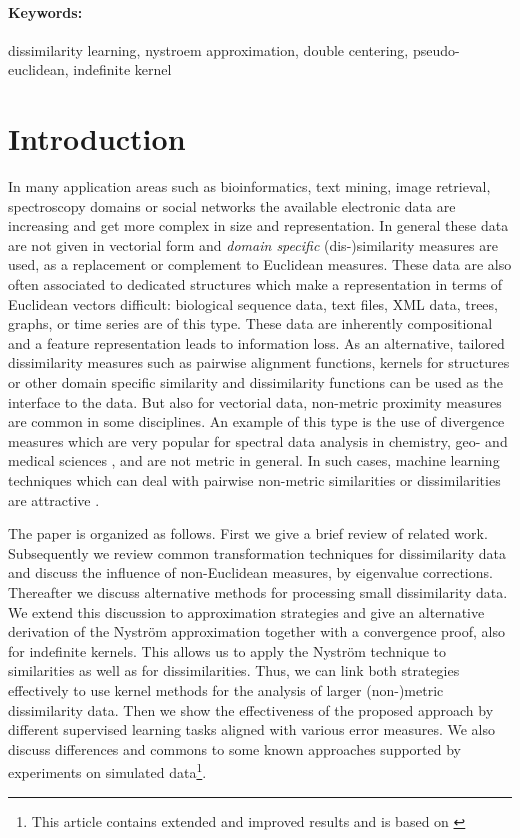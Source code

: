 \documentclass[twoside,11pt]{article}
\begin{document}
\paragraph*{Keywords:}
dissimilarity learning, nystroem approximation,
double centering, pseudo-euclidean, indefinite kernel



\section{Introduction}
In many application areas such as bioinformatics, text mining, image retrieval, spectroscopy domains or
social networks the available electronic data are increasing and get more complex in size and representation.
In general these data are not given in vectorial form and \emph{domain specific} (dis-)similarity measures 
are used, as a replacement or complement to Euclidean measures. These data are also often associated to dedicated 
structures which make a representation in terms of Euclidean vectors difficult: biological sequence data, text files, XML data, 
trees, graphs, or time series \cite{DBLP:journals/jmlr/ChenGGRC09,mediansom,neuhaus} are of this type. 
These data are inherently compositional and a feature representation leads to information loss. 
As an alternative, tailored dissimilarity measures such as pairwise  alignment functions, kernels for structures 
or other domain specific similarity and dissimilarity functions can  be used as the interface to the data.
But also for vectorial data,
non-metric proximity measures are common in some disciplines.
An example of this type is the use of divergence measures \cite{Cichocki20101532}
which are very popular for spectral data analysis in chemistry, geo- and medical
sciences \cite{Schleif2010h,Nguyen2013691}, and are not metric in general. 
In such cases, machine learning techniques which can deal with pairwise 
non-metric similarities or dissimilarities are attractive \cite{Pekalska2005a}.

The paper is organized as follows. First we give a brief review of related work. Subsequently we review common
transformation techniques for dissimilarity data and discuss the influence of non-Euclidean measures, by eigenvalue corrections. 
Thereafter we discuss alternative methods for processing small dissimilarity data. We extend this discussion to approximation strategies and 
give an alternative derivation of the Nystr\"om approximation together
with a convergence proof, also for indefinite kernels.
This allows us to apply the Nystr\"om technique
to similarities as well as for dissimilarities.
Thus, we can link both strategies effectively to use kernel methods for the analysis of larger (non-)metric dissimilarity data.
Then we show the effectiveness of the proposed approach
by different supervised learning tasks aligned with various error measures. We also discuss differences and commons
to some known approaches supported by experiments on simulated data\footnote{This article contains extended and improved results and is based on \cite{Schleif2013b}}.
\end{document}
